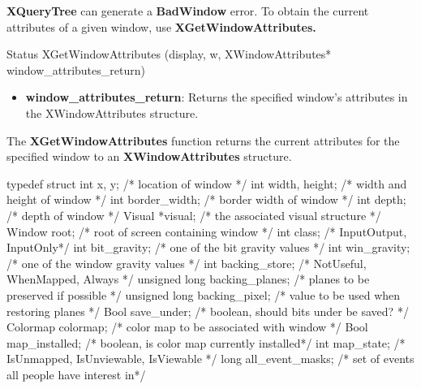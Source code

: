 \documentclass{report}
\begin{document}
\begin{itemize}
            \bigbreak \noindent 
            \textbf{XQueryTree} can generate a \textbf{BadWindow} error.
            \bigbreak \noindent 
            To obtain the current attributes of a given window, use \textbf{XGetWindowAttributes.}
            \bigbreak \noindent 
            \begin{cppcode}
                Status XGetWindowAttributes (display, w, XWindowAttributes* window_attributes_return)
            \end{cppcode}
            \begin{itemize}
                \item \textbf{window\_attributes\_return}: Returns the specified window’s attributes in the XWindowAttributes structure.
            \end{itemize}
            The \textbf{XGetWindowAttributes} function returns the current attributes for the specified window to an \textbf{XWindowAttributes} structure.
            \bigbreak \noindent 
            \begin{cppcode}
                typedef struct {
                    int x, y;                           /* location of window */
                    int width, height;                  /* width and height of window */
                    int border_width;                   /* border width of window */
                    int depth;                          /* depth of window */
                    Visual *visual;                     /* the associated visual structure */
                    Window root;                        /* root of screen containing window */
                    int class;                          /* InputOutput, InputOnly*/
                    int bit_gravity;                    /* one of the bit gravity values */
                    int win_gravity;                    /* one of the window gravity values */
                    int backing_store;                  /* NotUseful, WhenMapped, Always */
                    unsigned long backing_planes;       /* planes to be preserved if possible */
                    unsigned long backing_pixel;        /* value to be used when restoring planes */
                    Bool save_under;                    /* boolean, should bits under be saved? */
                    Colormap colormap;                  /* color map to be associated with window */
                    Bool map_installed;                 /* boolean, is color map currently installed*/
                    int map_state;                      /* IsUnmapped, IsUnviewable, IsViewable */
                    long all_event_masks;               /* set of events all people have interest in*/
}
\end{cppcode}
\end{itemize}
\end{document}
